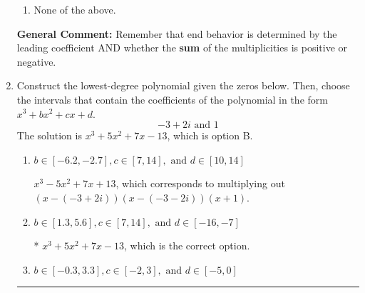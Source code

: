 \documentclass{extbook}[14pt]
\newcommand{\litem}[1]{\item #1

\rule{\textwidth}{0.4pt}}
\begin{document}
\begin{enumerate}
{\begin{enumerate}[label=\Alph*.]
\item None of the above.\end{enumerate}
\textbf{General Comment:} Remember that end behavior is determined by the leading coefficient AND whether the \textbf{sum} of the multiplicities is positive or negative.
}
\litem{
Construct the lowest-degree polynomial given the zeros below. Then, choose the intervals that contain the coefficients of the polynomial in the form $x^3+bx^2+cx+d$.
\[ -3 + 2 i \text{ and } 1 \]The solution is \( x^{3} +5 x^{2} +7 x -13 \), which is option B.\begin{enumerate}[label=\Alph*.]
\item \( b \in [-6.2, -2.7], c \in [7, 14], \text{ and } d \in [10, 14] \)

$x^{3} -5 x^{2} +7 x + 13$, which corresponds to multiplying out $(x-(-3 + 2 i))(x-(-3 - 2 i))(x + 1)$.
\item \( b \in [1.3, 5.6], c \in [7, 14], \text{ and } d \in [-16, -7] \)

* $x^{3} +5 x^{2} +7 x -13$, which is the correct option.
\item \( b \in [-0.3, 3.3], c \in [-2, 3], \text{ and } d \in [-5, 0] \)


\end{enumerate}}
\end{enumerate}
\end{document}
